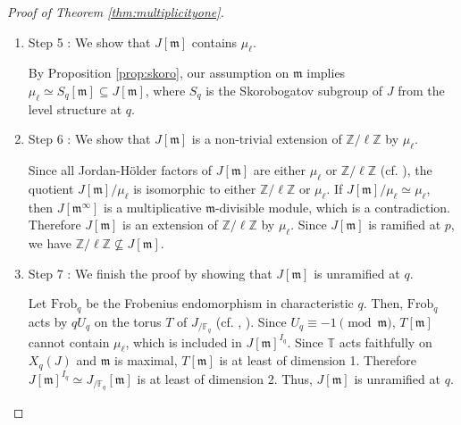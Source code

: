 \documentclass[a4paper, 12pt]{amsart}
\theoremstyle{definition}
\theoremstyle{remark}
\numberwithin{equation}{section} \numberwithin{table}{section}
\begin{document}
\begin{proof}[Proof of Theorem \ref{thm:multiplicityone}]
\begin{enumerate}
Let $I_p$ be an inertia subgroup of ${{\mathrm{Gal}(\overline{\mathbb{Q}}/{\mathbb{Q}})}}$ at $p$. Then by Serre-Tate \cite{ST68}, we have $J[{{\mathfrak{m}}}]^{I_p} \simeq J_{/{{{\mathbb{F}}}_p}}[{{\mathfrak{m}}}]$. Since $\Phi_p(J)[{{\mathfrak{m}}}]=0$ and $J^0[{{\mathfrak{m}}}] = {{\mathrm{Hom}}}(Y/{{{\mathfrak{m}}} Y},\, {{\mu_{\ell}}})$ is of dimension 1, $J[{{\mathfrak{m}}}]^{I_p} \simeq J^0[{{\mathfrak{m}}}]$ is of dimension 1 as well, where $J^0$ is the identity component of $J_{/{{{\mathbb{F}}}_p}}$. Therefore $J[{{\mathfrak{m}}}]$ is ramified at $p$.

\item Step 5 :  We show that $J[{{\mathfrak{m}}}]$ contains ${{\mu_{\ell}}}$.

By Proposition \ref{prop:skoro}, our assumption on ${{\mathfrak{m}}}$ implies ${{\mu_{\ell}}} \simeq S_q[{{\mathfrak{m}}}] \subseteq J[{{\mathfrak{m}}}]$, where $S_q$ is the Skorobogatov subgroup of $J$ from the level structure at $q$.

\item Step 6 : We show that $J[{{\mathfrak{m}}}]$ is a non-trivial extension of ${{{{\mathbb{Z}}}/{\ell{{\mathbb{Z}}}}}}$ by ${{\mu_{\ell}}}$.

Since all Jordan-H\"older factors of $J[{{\mathfrak{m}}}]$ are either ${{\mu_{\ell}}}$ or ${{{{\mathbb{Z}}}/{\ell{{\mathbb{Z}}}}}}$ 
(cf. \cite[Proposition 14.1]{M77}), the quotient
$J[{{\mathfrak{m}}}]/{{\mu_{\ell}}}$ is isomorphic to either ${{{{\mathbb{Z}}}/{\ell{{\mathbb{Z}}}}}}$ or ${{\mu_{\ell}}}$. If $J[{{\mathfrak{m}}}]/{{\mu_{\ell}}} \simeq {{\mu_{\ell}}}$, then $J[{{\mathfrak{m}}}^{\infty}]$ is a multiplicative ${{\mathfrak{m}}}$-divisible module, which is a contradiction. Therefore $J[{{\mathfrak{m}}}]$ is an extension of ${{{{\mathbb{Z}}}/{\ell{{\mathbb{Z}}}}}}$ by ${{\mu_{\ell}}}$. Since $J[{{\mathfrak{m}}}]$ is ramified at $p$, we have ${{{{\mathbb{Z}}}/{\ell{{\mathbb{Z}}}}}} \nsubseteq J[{{\mathfrak{m}}}]$.

\item Step 7 : We finish the proof by showing that $J[{{\mathfrak{m}}}]$ is unramified at $q$.

Let ${{\mathrm{Frob}}}_q$ be the Frobenius endomorphism in characteristic $q$. Then, ${{\mathrm{Frob}}}_q$ acts by $qU_q$ on the torus $T$ of $J_{/{{{\mathbb{F}}}_q}}$ (cf. \cite[Theorem 3.1]{JL86}, \cite{R89b}). Since $U_q \equiv -1 \pmod {{\mathfrak{m}}}$, $T[{{\mathfrak{m}}}]$ cannot contain ${{\mu_{\ell}}}$, which is included in $J[{{\mathfrak{m}}}]^{I_q}$.
Since ${{\mathbb{T}}}$ acts faithfully on $X_q(J)$ and ${{\mathfrak{m}}}$ is maximal, $T[{{\mathfrak{m}}}]$ is at least of dimension 1. Therefore $J[{{\mathfrak{m}}}]^{I_q} \simeq J_{/{{{\mathbb{F}}}_q}}[{{\mathfrak{m}}}]$ is at least of dimension 2. Thus, $J[{{\mathfrak{m}}}]$ is unramified at $q$.
\end{enumerate}
\end{proof}
\end{document}
